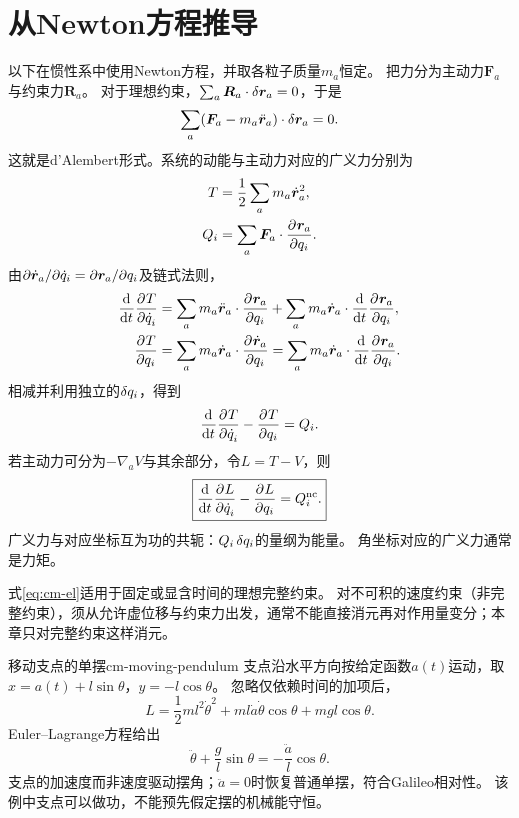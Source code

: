 \section{从Newton方程推导}
以下在惯性系中使用Newton方程，并取各粒子质量$m_a$恒定。
把力分为主动力$\bm F_a$与约束力$\bm R_a$。
对于理想约束，$\textstyle \sum_a\bm R_a \cdot \mathop{}\!\delta\bm r_a = 0$，于是
\begin{equation}
 \sum_a(\bm F_a - m_a\ddot{\bm r}_a) \cdot \mathop{}\!\delta\bm r_a = 0.
 \label{eq:cm-dalembert}
\end{equation}
这就是d'Alembert形式。系统的动能与主动力对应的广义力分别为
\begin{subequations}\label{eq:cm-generalized-force}
 \begin{align}
  T &= \frac12\sum_a m_a\dot{\bm{r}}_a^2,\\
  Q_i &= \sum_a\bm F_a \cdot \frac{\partial^{}\bm r_a}{\partial{q_i}^{}}.
 \end{align}
\end{subequations}
由$\partial\dot{\bm{r}}_a/\partial\dot q_i = \partial\bm r_a/\partial q_i$及链式法则，
\begin{align*}
 \frac{\mathop{}\!\mathrm{d}^{}}{\mathrm{d}{t}^{}}\frac{\partial^{}T}{\partial{\dot q_i}^{}}
 &= \sum_a m_a\ddot{\bm r}_a \cdot \frac{\partial^{}\bm r_a}{\partial{q_i}^{}}
 + \sum_a m_a\dot{\bm{r}}_a \cdot \frac{\mathop{}\!\mathrm{d}^{}}{\mathrm{d}{t}^{}}\frac{\partial^{}\bm r_a}{\partial{q_i}^{}},\\
 \frac{\partial^{}T}{\partial{q_i}^{}} &= \sum_a m_a\dot{\bm{r}}_a \cdot \frac{\partial^{}\dot{\bm{r}}_a}{\partial{q_i}^{}}
 = \sum_a m_a\dot{\bm{r}}_a \cdot \frac{\mathop{}\!\mathrm{d}^{}}{\mathrm{d}{t}^{}}\frac{\partial^{}\bm r_a}{\partial{q_i}^{}}.
\end{align*}
相减并利用独立的$\mathop{}\!\delta q_i$，得到
\begin{equation}
 \frac{\mathop{}\!\mathrm{d}^{}}{\mathrm{d}{t}^{}}\frac{\partial^{}T}{\partial{\dot q_i}^{}} - \frac{\partial^{}T}{\partial{q_i}^{}} = Q_i.
\end{equation}
若主动力可分为$-\nabla_aV$与其余部分，令$L = T - V$，则
\begin{equation}
 \boxed{\frac{\mathop{}\!\mathrm{d}^{}}{\mathrm{d}{t}^{}}\frac{\partial^{}L}{\partial{\dot q_i}^{}} - \frac{\partial^{}L}{\partial{q_i}^{}} = Q_i^{\mathrm{nc}}.}
 \label{eq:cm-el}
\end{equation}
广义力与对应坐标互为功的共轭：$Q_i\mathop{}\!\delta q_i$的量纲为能量。
角坐标对应的广义力通常是力矩。

式\eqref{eq:cm-el}适用于固定或显含时间的理想完整约束。
对不可积的速度约束（非完整约束），须从允许虚位移与约束力出发，通常不能直接消元再对作用量变分；本章只对完整约束这样消元。

\begin{example}{移动支点的单摆}{cm-moving-pendulum}
支点沿水平方向按给定函数$a(t)$运动，取
$x = a(t) + l\sin\theta$，$y = -l\cos\theta$。
忽略仅依赖时间的加项后，
\begin{equation}
 L = \frac12ml^2\dot\theta^2 + ml\dot a\dot\theta\cos\theta + mgl\cos\theta.
\end{equation}
Euler--Lagrange方程给出
\begin{equation}
 \ddot\theta + \frac gl\sin\theta = -\frac{\ddot a}{l}\cos\theta.
\end{equation}
支点的加速度而非速度驱动摆角；$\ddot a = 0$时恢复普通单摆，符合Galileo相对性。
该例中支点可以做功，不能预先假定摆的机械能守恒。
\end{example}

